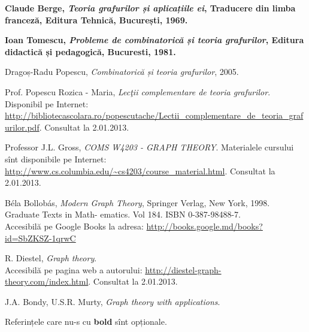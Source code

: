 \begin{thebibliography}{9}

 {\bf Claude Berge, {\em Teoria grafurilor și aplicațiile ei}, Traducere din limba franceză, Editura Tehnică, București, 1969.}

 {\bf Ioan Tomescu, {\em Probleme de combinatorică și teoria grafurilor}, Editura didactică și pedagogică, Bucuresti, 1981.}

 Dragoș-Radu Popescu, {\em Combinatorică și teoria grafurilor}, 2005.

 Prof. Popescu Rozica - Maria, {\em Lecţii complementare de teoria grafurilor}.\\
Disponibil pe Internet: \url{http://bibliotecascolara.ro/popescutache/Lectii_complementare_de_teoria_grafurilor.pdf}.
Consultat la 2.01.2013.

 Professor J.L. Gross, {\em COMS W4203 - GRAPH THEORY}. 
Materialele cursului sînt disponibile pe Internet: \url{http://www.cs.columbia.edu/~cs4203/course_material.html}.
Consultat la 2.01.2013.

 B\' ela Bollob\' as, {\em Modern Graph Theory}, Springer Verlag, New York, 1998. Graduate Texts in Math-
ematics. Vol 184. ISBN 0-387-98488-7.\\
Accesibilă pe Google Books la adresa: {\footnotesize \url{http://books.google.md/books?id=SbZKSZ-1qrwC}} 

 R. Diestel, {\em Graph theory}.\\ 
Accesibilă pe pagina web a autorului: \url{http://diestel-graph-theory.com/index.html}.
Consultat la 2.01.2013.

 J.A. Bondy, U.S.R. Murty, {\em Graph theory with applications}.\\

\end{thebibliography}

Referințele care nu-s cu {\bf bold} sînt opționale.


